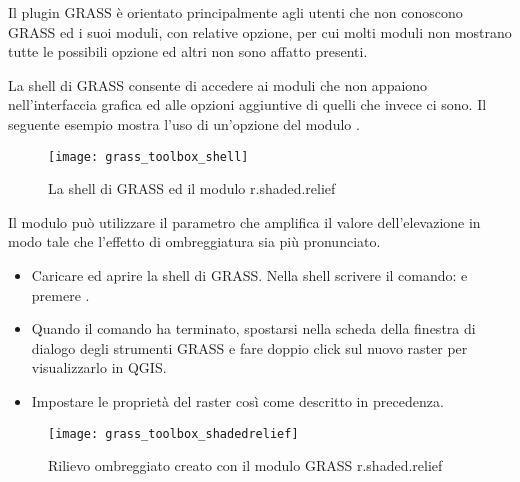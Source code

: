  
Il plugin GRASS è orientato principalmente agli utenti che non conoscono 
GRASS ed i suoi moduli, con relative opzione, per cui molti moduli non 
mostrano tutte le possibili opzione ed altri non sono affatto presenti.

La shell di GRASS consente di accedere ai moduli che non appaiono 
nell'interfaccia grafica ed alle opzioni aggiuntive di quelli che invece ci sono.
Il seguente esempio mostra l'uso di un'opzione del modulo .

\begin{figure}[ht]
 \centering
 \texttt{[image: grass\_toolbox\_shell]}
 \caption{La shell di GRASS ed il modulo r.shaded.relief \nixcaption}\label{fig:grass_toolbox_shell}
\end{figure}

Il modulo  può utilizzare il parametro 
che amplifica il valore dell'elevazione in modo tale che l'effetto di ombreggiatura 
sia più pronunciato.

\begin{itemize}[label=--]
\item Caricare  ed aprire la shell di GRASS. Nella shell scrivere 
il comando:\linebreak
{} \linebreak e premere .
\end{itemize}

\begin{itemize}[label=--]
\item Quando il comando ha terminato, spostarsi nella scheda  della 
finestra di dialogo degli strumenti GRASS e fare doppio click sul nuovo raster 
 per visualizzarlo in QGIS. 
\item Impostare le proprietà del raster così come descritto in precedenza.
\end{itemize}

\begin{figure}[ht]
 \centering
 \texttt{[image: grass\_toolbox\_shadedrelief]}
 \caption{Rilievo ombreggiato creato con il modulo GRASS r.shaded.relief \nixcaption}\label{fig:grass_toolbox_shadedrelief}
\end{figure}


